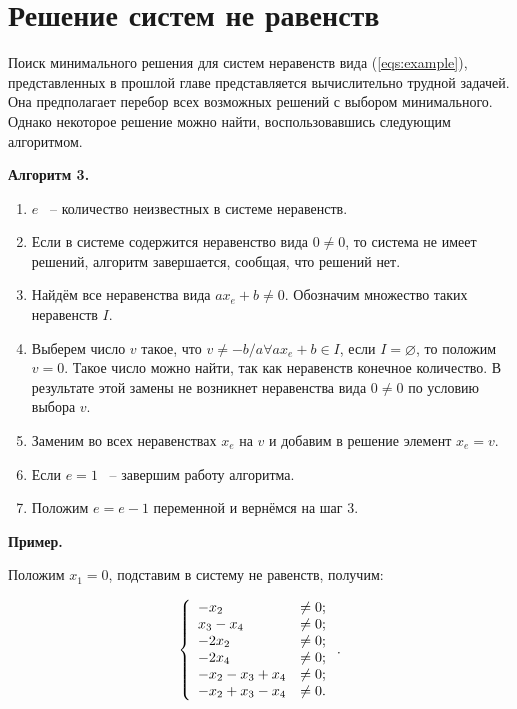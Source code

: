 \documentclass[14pt]{mmcs-article}
\begin{document}
\section{Решение систем не равенств}

Поиск минимального решения для систем неравенств вида (\ref{eqs:example}), представленных в прошлой главе представляется вычислительно трудной задачей. Она предполагает перебор всех возможных решений с выбором минимального. Однако некоторое решение можно найти, воспользовавшись следующим алгоритмом.

\textbf{Алгоритм 3.}

\begin{enumerate}
    \item $e$ ~-- количество неизвестных в системе неравенств.
    \item Если в системе содержится неравенство вида $0 \neq 0$, то система не имеет решений, алгоритм завершается, сообщая, что решений нет.
    \item Найдём все неравенства вида $a x_e + b \neq 0$. Обозначим множество таких неравенств $I$.
    \item Выберем число $v$ такое, что $v \neq -b/a \forall a x_e + b \in I$, если $I = \varnothing$, то положим $v = 0$. Такое число можно найти, так как неравенств конечное количество. В результате этой замены не возникнет неравенства вида $0 \neq 0$ по условию выбора $v$.
    \item Заменим во всех неравенствах $x_e$ на $v$ и добавим в решение элемент $x_e = v$.
    \item Если $e = 1$ ~-- завершим работу алгоритма.
    \item Положим $e = e - 1$ переменной и вернёмся на шаг 3.
\end{enumerate}

\textbf{Пример.}

Положим $x_1 = 0$, подставим в систему не равенств, получим:

\begin{equation}
    \centering
    \left\{
        \begin{array}{ll}
            - x_2 &\neq 0            ; \\
            x_3 - x_4 &\neq 0        ; \\
            - 2 x_2 &\neq 0          ; \\
            - 2 x_4 &\neq 0          ; \\
            - x_2 - x_3 + x_4 &\neq 0; \\
            - x_2 + x_3 - x_4 &\neq 0. \\
        \end{array}
    \right..
    \label{eqs:cycle_search_neqs}
\end{equation}
\end{document}
